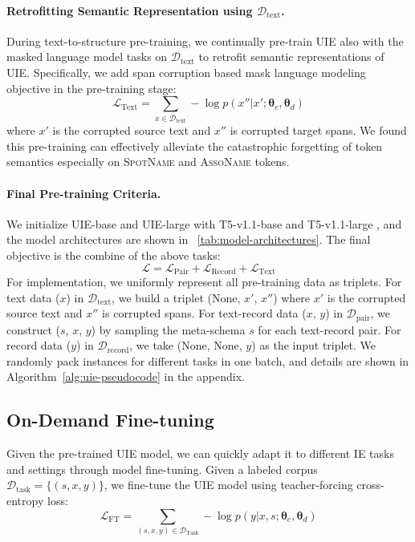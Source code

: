 \documentclass[11pt]{article}
\begin{document}
\paragraph{Retrofitting Semantic Representation using $\mathcal{D}_{\text{text}}$.}

During text-to-structure pre-training, we continually pre-train UIE also with the masked language model tasks \citep{2020t5} on $\mathcal{D}_{\text{text}}$ to retrofit semantic representations of UIE.
Specifically, we add span corruption based mask language modeling objective in the pre-training stage:
\begin{equation} \label{equ:mask_language_modeling}
    \mathcal{L}_{\text{Text}} =  \sum_{x \in \mathcal{D}_{\text{text}}} - \log p(x''|x'; \mathbf{\theta}_{e}, \mathbf{\theta}_{d})
\end{equation}
where $x'$ is the corrupted source text and $x''$ is corrupted target spans.
We found this pre-training can effectively alleviate the catastrophic forgetting of token semantics especially on \textsc{SpotName} and \textsc{AssoName} tokens.

\paragraph{Final Pre-training Criteria.}
We initialize UIE-base and UIE-large with T5-v1.1-base and T5-v1.1-large \citep{2020t5}, and the model architectures are shown in \tablename~\ref{tab:model-architectures}.
The final objective is the combine of the above tasks:
\begin{equation}
    \mathcal{L} = \mathcal{L}_{\text{Pair}} + \mathcal{L}_{\text{Record}} + \mathcal{L}_{\text{Text}}
\end{equation}
For implementation, we uniformly represent all pre-training data as triplets.
For text data ($x$) in $\mathcal{D}_{\text{text}}$, we build a triplet (None, $x'$, $x''$) where  $x'$ is the corrupted source text and $x''$ is corrupted spans.
For text-record data ($x$, $y$) in $\mathcal{D}_{\text{pair}}$, we construct ($s$, $x$, $y$) by sampling the meta-schema $s$ for each text-record pair.
For record data ($y$) in $\mathcal{D}_{\text{record}}$, we take (None, None, $y$) as the input triplet.
We randomly pack instances for different tasks in one batch, and details are shown in Algorithm~\ref{alg:uie-pseudocode} in the appendix.


\subsection{On-Demand Fine-tuning}
Given the pre-trained UIE model, we can quickly adapt it to different IE tasks and settings through model fine-tuning.
Given a labeled corpus $\mathcal{D}_{\text{task}} = \{(s, x, y)\}$, we fine-tune the UIE model using teacher-forcing cross-entropy loss:
\begin{equation} \label{equ:fine_tuning}
  \mathcal{L}_{\text{FT}} = \sum_{(s,x,y)\in\mathcal{D}_{\text{Task}}}
  - \log p(y|x,s;\mathbf{\theta}_{e},\mathbf{\theta}_{d})
\end{equation}
\end{document}
